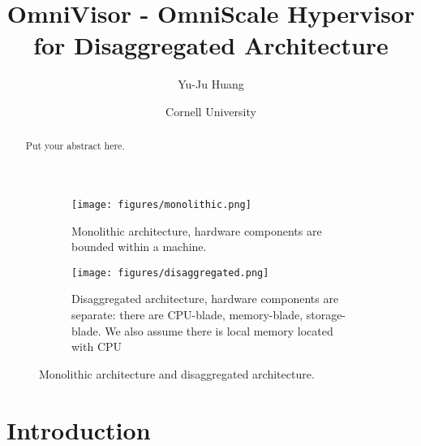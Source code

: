 \documentclass[twocolumn]{article}
\title{OmniVisor - OmniScale Hypervisor for Disaggregated Architecture}
\author{Yu-Ju Huang}
\date{Cornell University}
\begin{document}
\maketitle

\begin{abstract}
Put your abstract here.
\end{abstract}

\iffalse
\begin{figure*}[h!]
  \subcaptionbox{Monolithic architecture, hardware components are bounded within a machine.\label{fig:monolithic}}[.3\textwidth]{\texttt{[image: figures/monolithic.png]}}
  \subcaptionbox{Disaggregated architecture, hardware components are separate: there are CPU-blade, memory-blade, storage-blade. We also assume there is local memory located with CPU.\label{fig:disaggregated}}[.7\textwidth]{\texttt{[image: figures/disaggregated.png]}}
  \caption{Monolithic architecture and disaggregated architecture.}
  \label{fig:architecture}
\end{figure*}
\fi

\begin{figure*}[h!]
     \centering
     \captionsetup[subfigure]{position=b}
     \begin{subfigure}[b]{0.28\textwidth}
         \texttt{[image: figures/monolithic.png]}
         \caption{Monolithic architecture, hardware components are bounded within a machine.}
         \label{fig:monolithic architecture}
     \end{subfigure}
     \hfill
     \begin{subfigure}[b]{0.68\textwidth}
         \texttt{[image: figures/disaggregated.png]}
         \caption{Disaggregated architecture, hardware components are separate: there are CPU-blade, memory-blade, storage-blade. We also assume there is local memory located with CPU}
         \label{fig:disaggregated architecture}
     \end{subfigure}
     \caption{Monolithic architecture and disaggregated architecture.}
     \label{fig:architecture}
\end{figure*}

\section{Introduction}
\end{document}
